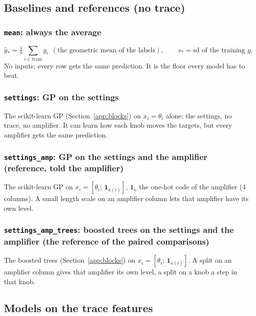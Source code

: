 \subsection{Baselines and references (no trace)}

\subsubsection{\texttt{mean}: always the average}
\[ \hat y_*=\tfrac1n\textstyle\sum_{i\in\text{train}}y_i\ \ (\text{the geometric mean of the labels}),\qquad s_*=\text{sd of the training }y. \]
No inputs; every row gets the same prediction. It is the floor every model has to beat.


\subsubsection{\texttt{settings}: GP on the settings}
The scikit-learn GP (Section~\ref{app:blocks}) on $x_i=\theta_i$ alone: the settings, no trace, no amplifier. It can
learn how each knob moves the targets, but every amplifier gets the same prediction.


\subsubsection{\texttt{settings\_amp}: GP on the settings and the amplifier (reference, told the amplifier)}
The scikit-learn GP on $x_i=[\theta_i;\,\mathbf 1_{a(i)}]$, $\mathbf 1_a$ the one-hot code of the amplifier (4 columns).
A small length scale on an amplifier column lets that amplifier have its own level.


\subsubsection{\texttt{settings\_amp\_trees}: boosted trees on the settings and the amplifier (the reference of the paired comparisons)}
The boosted trees (Section~\ref{app:blocks}) on $x_i=[\theta_i;\,\mathbf 1_{a(i)}]$. A split on an amplifier column gives
that amplifier its own level, a split on a knob a step in that knob.


\subsection{Models on the trace features}

